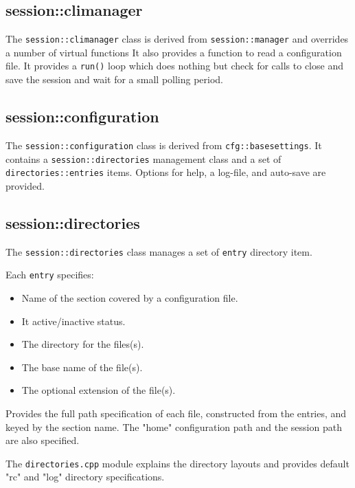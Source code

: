 \subsection{session::climanager}
\label{subsec:session_namespace_climanager}

   The \texttt{session::climanager} class is derived from
   \texttt{session::manager} and overrides a number of virtual functions
   It also provides a function to read a configuration file.
   It provides a \texttt{run()} loop which does nothing
   but check for calls to close and save the session and wait for a small
   polling period.

\subsection{session::configuration}
\label{subsec:session_namespace_configuration}

   The \texttt{session::configuration} class is derived from
   \texttt{cfg::basesettings}.
   It contains a \texttt{session::directories} management class
   and a set of
   \texttt{directories::entries} items.
   Options for help, a log-file, and auto-save are provided.

\subsection{session::directories}
\label{subsec:session_namespace_directories}

   The \texttt{session::directories} class manages a set of
   \texttt{entry} directory item.

   Each \texttt{entry} specifies:

   \begin{itemize}
      \item Name of the section covered by a configuration file.
      \item It active/inactive status.
      \item The directory for the files(s).
      \item The base name of the file(s).
      \item The optional extension of the file(s).
   \end{itemize}

   Provides the full path specification of each file, constructed
   from the entries, and keyed by the section name.
   The "home" configuration path and the session path are also specified.

   The \texttt{directories.cpp} module explains the directory layouts
   and provides default "rc" and "log" directory specifications.

